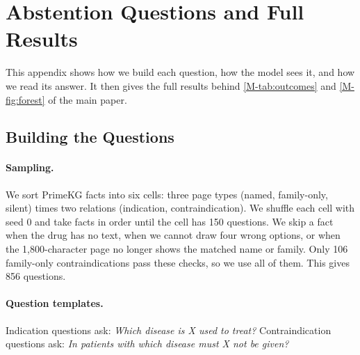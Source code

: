 \section{Abstention Questions and Full Results}
\label{app:questions}

This appendix shows how we build each question, how the model sees it, and how we read its answer. It then gives the full results behind \cref{M-tab:outcomes} and \cref{M-fig:forest} of the main paper.

\subsection{Building the Questions}

\paragraph{Sampling.}
We sort PrimeKG facts into six cells: three page types (named, family-only, silent) times two relations (indication, contraindication). We shuffle each cell with seed 0 and take facts in order until the cell has 150 questions. We skip a fact when the drug has no text, when we cannot draw four wrong options, or when the 1,800-character page no longer shows the matched name or family. Only 106 family-only contraindications pass these checks, so we use all of them. This gives 856 questions.

\paragraph{Question templates.}
Indication questions ask: \emph{Which disease is X used to treat?} Contraindication questions ask: \emph{In patients with which disease must X not be given?}

